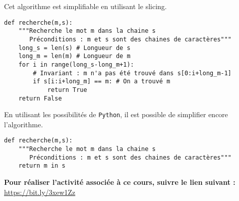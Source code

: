 Cet algorithme est simplifiable en utilisant le slicing.
\begin{lstlisting}
def recherche(m,s):
    """Recherche le mot m dans la chaine s
       Préconditions : m et s sont des chaines de caractères"""
    long_s = len(s) # Longueur de s
    long_m = len(m) # Longueur de m
    for i in range(long_s-long_m+1): 
        # Invariant : m n'a pas été trouvé dans s[0:i+long_m-1]
        if s[i:i+long_m] == m: # On a trouvé m
            return True
    return False
\end{lstlisting}

En utilisant les possibilités de \texttt{Python}, il est possible de simplifier encore l'algorithme. 

\begin{lstlisting}
def recherche(m,s):
    """Recherche le mot m dans la chaine s
       Préconditions : m et s sont des chaines de caractères"""
    return m in s
\end{lstlisting}




\textbf{Pour réaliser l'activité associée à ce cours, suivre le lien suivant : }
\url{https://bit.ly/3xew1Zz}